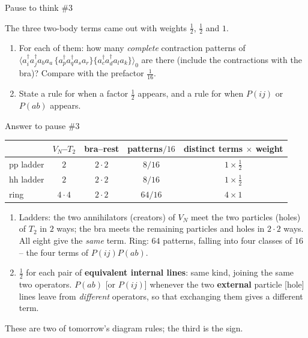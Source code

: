 \documentclass[aspectratio=169,10pt]{beamer}
\newcounter{thinkctr}
\newcommand{\thinkq}[2]{%
  \stepcounter{thinkctr}%
  \vfill
  \begin{tcolorbox}[enhanced,colback=palewarm,colframe=warm,boxrule=1.2pt,arc=4pt,
    grow to left by=6mm,grow to right by=6mm,
    left=16pt,right=16pt,top=16pt,bottom=18pt,
    fonttitle=\bfseries\Large,fontupper=\Large,
    title={Pause to think \#\thethinkctr\hfill\mdseries\normalsize(about #1 min -- discuss with your neighbour)}]
  #2
  \end{tcolorbox}
  \vfill}
\newcommand{\thinka}[1]{%
  \vfill
  \begin{tcolorbox}[enhanced,colback=paleteal,colframe=teal,boxrule=1.2pt,arc=4pt,
    grow to left by=6mm,grow to right by=6mm,
    left=16pt,right=16pt,top=16pt,bottom=18pt,
    fonttitle=\bfseries\Large,fontupper=\large,
    title={Answer to pause \#\thethinkctr}]
  #1
  \end{tcolorbox}
  \vfill}
\newcommand{\av}[1]{\langle #1\rangle_0}
\newcommand{\cre}[1]{a_{#1}^{\dagger}}
\newcommand{\ann}[1]{a_{#1}}
\newcommand{\no}[1]{\bigl\{#1\bigr\}}
\begin{document}
\begin{frame}{Pause to think \#3}
\thinkq{4}{The three two-body terms came out with weights $\tfrac12$, $\tfrac12$ and $1$.
\begin{enumerate}
\item For each of them: how many \emph{complete} contraction patterns of
$\av{\cre i\cre j\ann b\ann a\,\no{\cre p\cre q\ann s\ann r}\no{\cre c\cre d\ann l\ann k}}$ are there (include the contractions with the bra)? Compare with the prefactor $\tfrac1{16}$.
\item State a rule for when a factor $\tfrac12$ appears, and a rule for when $P(ij)$ or $P(ab)$ appears.
\end{enumerate}}
\end{frame}

\begin{frame}{Answer to pause \#3}
\thinka{\normalsize%
\begin{center}
\renewcommand{\arraystretch}{1.25}
\begin{tabular}{lcccc}
\toprule
 & $V_N$--$T_2$ & bra--rest & patterns$/16$ & distinct terms $\times$ weight\\
\midrule
pp ladder & $2$ & $2\cdot2$ & $8/16$ & $1\times\tfrac12$\\
hh ladder & $2$ & $2\cdot2$ & $8/16$ & $1\times\tfrac12$\\
ring & $4\cdot4$ & $2\cdot2$ & $64/16$ & $4\times1$\\
\bottomrule
\end{tabular}
\end{center}
\begin{enumerate}
\item Ladders: the two annihilators (creators) of $V_N$ meet the two particles (holes) of $T_2$ in $2$ ways; the bra meets the remaining particles and holes in $2\cdot2$ ways. All eight give the \emph{same} term. Ring: $64$ patterns, falling into four classes of $16$ -- the four terms of $P(ij)P(ab)$.
\item $\tfrac12$ for each pair of \textbf{equivalent internal lines}: same kind, joining the same two operators. $P(ab)$ [or $P(ij)$] whenever the two \textbf{external} particle [hole] lines leave from \emph{different} operators, so that exchanging them gives a different term.
\end{enumerate}
These are two of tomorrow's diagram rules; the third is the sign.}
\end{frame}
\end{document}
